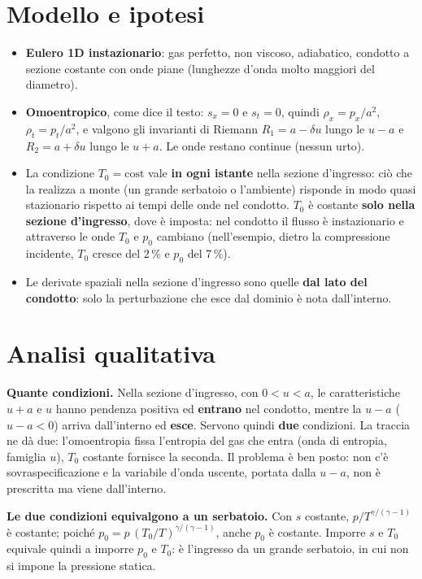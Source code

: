 \documentclass[11pt,a4paper]{article}
\newcommand{\Ru}{R_1}
\newcommand{\Rd}{R_2}
\newcommand{\uma}{u-a}
\newcommand{\upa}{u+a}
\begin{document}
\section{Modello e ipotesi}
\begin{itemize}
  \item \textbf{Eulero 1D instazionario}: gas perfetto, non viscoso, adiabatico, condotto a sezione costante con
        onde piane (lunghezze d'onda molto maggiori del diametro).
  \item \textbf{Omoentropico}, come dice il testo: $s_x=0$ e $s_t=0$, quindi $\rho_x=p_x/a^2$, $\rho_t=p_t/a^2$, e
        valgono gli invarianti di Riemann $\Ru=a-\delta u$ lungo le $\uma$ e $\Rd=a+\delta u$ lungo le $\upa$. Le onde
        restano continue (nessun urto).
  \item La condizione $T_0=\text{cost}$ vale \textbf{in ogni istante} nella sezione d'ingresso: ciò che la
        realizza a monte (un grande serbatoio o l'ambiente) risponde in modo quasi stazionario rispetto ai tempi
        delle onde nel condotto. $T_0$ è costante \textbf{solo nella sezione d'ingresso}, dove è imposta: nel
        condotto il flusso è instazionario e attraverso le onde $T_0$ e $p_0$ cambiano (nell'esempio, dietro la
        compressione incidente, $T_0$ cresce del 2\,\% e $p_0$ del 7\,\%).
  \item Le derivate spaziali nella sezione d'ingresso sono quelle \textbf{dal lato del condotto}: solo la
        perturbazione che esce dal dominio è nota dall'interno.
\end{itemize}

\section{Analisi qualitativa}
\textbf{Quante condizioni.} Nella sezione d'ingresso, con $0<u<a$, le caratteristiche $\upa$ e $u$ hanno pendenza
positiva ed \textbf{entrano} nel condotto, mentre la $\uma$ ($u-a<0$) arriva dall'interno ed \textbf{esce}. Servono
quindi \textbf{due} condizioni. La traccia ne dà due: l'omoentropia fissa l'entropia del gas che entra (onda di
entropia, famiglia $u$), $T_0$ costante fornisce la seconda. Il problema è ben posto: non c'è sovraspecificazione e
la variabile d'onda uscente, portata dalla $\uma$, non è prescritta ma viene dall'interno.

\textbf{Le due condizioni equivalgono a un serbatoio.} Con $s$ costante, $p/T^{\gamma/(\gamma-1)}$ è costante; poiché
$p_0=p\,(T_0/T)^{\gamma/(\gamma-1)}$, anche $p_0$ è costante. Imporre $s$ e $T_0$ equivale quindi a imporre $p_0$ e
$T_0$: è l'ingresso da un grande serbatoio, in cui non si impone la pressione statica.
\end{document}
